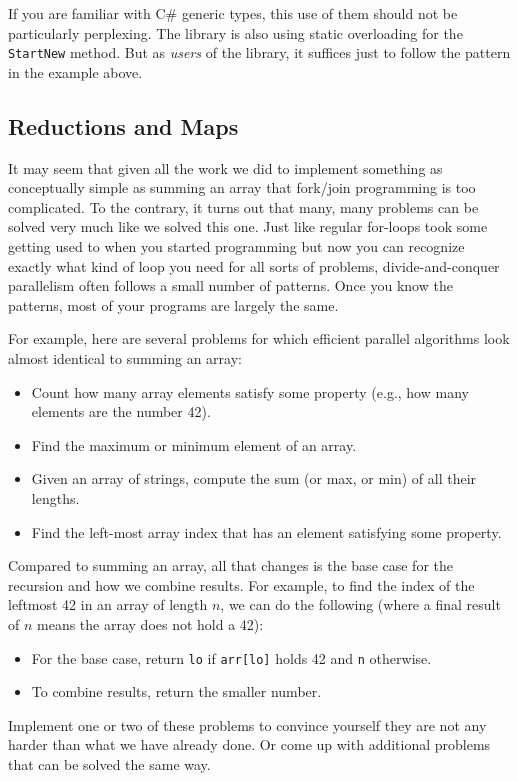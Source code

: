 \documentclass[10pt]{article}
\begin{document}
If you are familiar with C\# generic types, this use of them should
not be particularly perplexing.  The library is also using static
overloading for the {\tt StartNew} method.  But as \emph{users} of the
library, it suffices just to follow the pattern in the example above.

\subsection{Reductions and Maps}
\label{sec:map-reduce}

It may seem that given all the work we did to implement something as
conceptually simple as summing an array that fork/join programming is
too complicated.  To the contrary, it turns out that many, many
problems can be solved very much like we solved this one.  Just like
regular for-loops took some getting used to when you started
programming but now you can recognize exactly what kind of loop you
need for all sorts of problems, divide-and-conquer parallelism 
often follows a small number of patterns.  Once you know the patterns,
most of your programs are largely the same.

For example, here are several problems for which efficient parallel
algorithms look almost identical to summing an array:
\begin{itemize}
\item Count how many array elements satisfy some property (e.g., how
  many elements are the number 42).
\item Find the maximum or minimum element of an array.
\item Given an array of strings, compute the sum (or max, or min) of
  all their lengths.
\item Find the left-most array index that has an element satisfying
  some property.
\end{itemize}
Compared to summing an array, all that changes is the base case for
the recursion and how we combine results.  For example, to find the
index of the leftmost 42 in an array of length $n$, we can do the
following (where a final result of $n$ means the array does not hold a
42):
\begin{itemize}
\item For the base case, return {\tt lo} if {\tt arr[lo]} holds 42 and
  {\tt n} otherwise.
\item To combine results, return the smaller number.
\end{itemize}
Implement one or two of these problems to convince yourself they are not any
harder than what we have already done.  Or come up with additional
problems that can be solved the same way.
\end{document}
